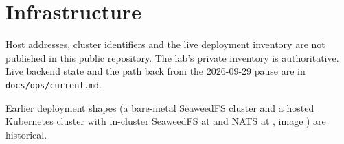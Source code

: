 \documentclass[11pt,a4paper]{article}
\begin{document}
\section{Infrastructure}

Host addresses, cluster identifiers and the live deployment inventory are
not published in this public repository. The lab's private inventory is
authoritative. Live backend state and the path back from the 2026-09-29
pause are in \texttt{docs/ops/current.md}.

Earlier deployment shapes (a bare-metal SeaweedFS cluster and a hosted
Kubernetes cluster with in-cluster SeaweedFS at
 and NATS at
, image
) are historical.
\end{document}
